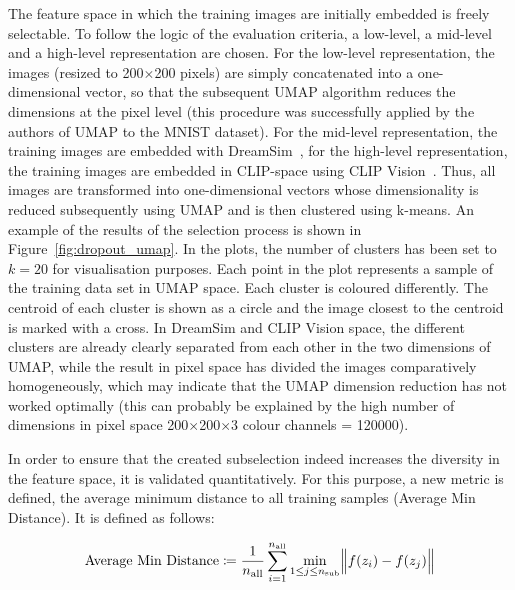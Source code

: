 The feature space in which the training images are initially embedded is freely selectable. To follow the logic of the evaluation criteria, a low-level, a mid-level and a high-level representation are chosen. For the low-level representation, the images (resized to 200$\times$200 pixels) are simply concatenated into a one-dimensional vector, so that the subsequent UMAP algorithm reduces the dimensions at the pixel level (this procedure was successfully applied by the authors of UMAP to the MNIST dataset). For the mid-level representation, the training images are embedded with DreamSim~\cite{fuDreamSimLearningNew2023}, for the high-level representation, the training images are embedded in CLIP-space using CLIP Vision~\cite{radfordLearningTransferableVisual2021}. Thus, all images are transformed into one-dimensional vectors whose dimensionality is reduced subsequently using UMAP and is then clustered using k-means. 
An example of the results of the selection process is shown in Figure~\ref{fig:dropout_umap}. In the plots, the number of clusters has been set to $k=20$ for visualisation purposes. Each point in the plot represents a sample of the training data set in UMAP space. Each cluster is coloured differently. The centroid of each cluster is shown as a circle and the image closest to the centroid is marked with a cross. In DreamSim and CLIP Vision space, the different clusters are already clearly separated from each other in the two dimensions of UMAP, while the result in pixel space has divided the images comparatively homogeneously, which may indicate that the UMAP dimension reduction has not worked optimally (this can probably be explained by the high number of dimensions in pixel space 200$\times$200$\times$3 colour channels = 120000). 

In order to ensure that the created subselection indeed increases the diversity in the feature space, it is validated quantitatively. For this purpose, a new metric is defined, the average minimum distance to all training samples (Average Min Distance). It is defined as follows:

\[
\text{Average Min Distance}
\coloneq \frac{1}{n_{\text{all}}}
  \sum_{i=1}^{n_{\text{all}}}
    \min_{1 \le j \le n_{\text{sub}}}
      \Bigl\lVert f(z_i) - f(z_j) \Bigr\rVert
\]

\noindent{}

